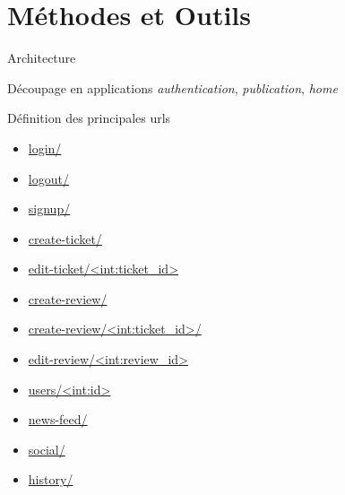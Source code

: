 \section{Méthodes et Outils}

\begin{frame}{Architecture}
  \begin{block}{Découpage en applications}
    {\color{darkred}\textit{authentication}}, 
    {\color{darkblue}\textit{publication}}, 
    {\color{darkgreen}\textit{home}}
  \end{block}
  
  \begin{block}{Définition des principales urls}
    \tiny
    \begin{itemize}
    \item {\color{darkred} \url{login/}}
    \item {\color{darkred} \url{logout/}}
    \item {\color{darkred} \url{signup/}}
    \item {\color{darkblue} \url{create-ticket/}}
    \item {\color{darkblue} \url{edit-ticket/<int:ticket_id>}}
    \item {\color{darkblue} \url{create-review/}}
    \item {\color{darkblue} \url{create-review/<int:ticket_id>/}}
    \item {\color{darkblue} \url{edit-review/<int:review_id>}}

    \item {\color{darkgreen} \url{users/<int:id>}}
    \item {\color{darkgreen} \url{news-feed/}}
    \item {\color{darkgreen} \url{social/}}
    \item {\color{darkgreen} \url{history/}}
    \end{itemize}
  \end{block}
\end{frame}
